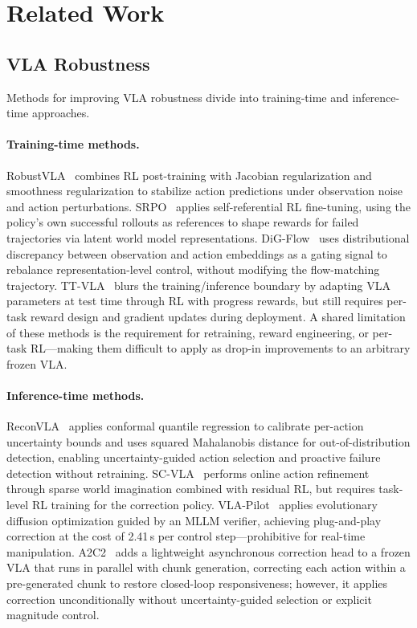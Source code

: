 \section{Related Work}\label{sec:related_work}

\subsection{VLA Robustness}

Methods for improving VLA robustness divide into training-time and inference-time approaches.

\paragraph{Training-time methods.}
RobustVLA~\cite{robustvla2025} combines RL post-training with Jacobian regularization and smoothness regularization to stabilize action predictions under observation noise and action perturbations.
SRPO~\cite{srpo2025} applies self-referential RL fine-tuning, using the policy's own successful rollouts as references to shape rewards for failed trajectories via latent world model representations.
DiG-Flow~\cite{digflow2025} uses distributional discrepancy between observation and action embeddings as a gating signal to rebalance representation-level control, without modifying the flow-matching trajectory.
TT-VLA~\cite{liu2026ttvla} blurs the training/inference boundary by adapting VLA parameters at test time through RL with progress rewards, but still requires per-task reward design and gradient updates during deployment.
A shared limitation of these methods is the requirement for retraining, reward engineering, or per-task RL---making them difficult to apply as drop-in improvements to an arbitrary frozen VLA.

\paragraph{Inference-time methods.}
ReconVLA~\cite{chen2026reconvla} applies conformal quantile regression to calibrate per-action uncertainty bounds and uses squared Mahalanobis distance for out-of-distribution detection, enabling uncertainty-guided action selection and proactive failure detection without retraining.
SC-VLA~\cite{liu2026scvla} performs online action refinement through sparse world imagination combined with residual RL, but requires task-level RL training for the correction policy.
VLA-Pilot~\cite{li2025vlapilot} applies evolutionary diffusion optimization guided by an MLLM verifier, achieving plug-and-play correction at the cost of 2.41\,s per control step---prohibitive for real-time manipulation.
A2C2~\cite{a2c2_2025} adds a lightweight asynchronous correction head to a frozen VLA that runs in parallel with chunk generation, correcting each action within a pre-generated chunk to restore closed-loop responsiveness; however, it applies correction unconditionally without uncertainty-guided selection or explicit magnitude control.


